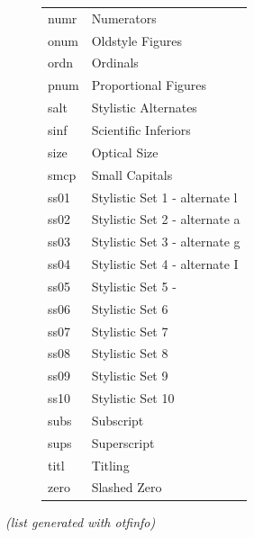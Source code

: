 \documentclass[10pt,a4paper,english]{article}
\begin{document}
\begin{figure}[ht]
\begin{tabular}{>{\ttfamily}l l}
        numr & Numerators \\
        onum & Oldstyle Figures \\
        ordn & Ordinals \\
        pnum & Proportional Figures \\
        salt & Stylistic Alternates \\
        sinf & Scientific Inferiors \\
        size & Optical Size \\
        smcp & Small Capitals \\
        ss01 & Stylistic Set 1 - alternate l \\
        ss02 & Stylistic Set 2 - alternate a \\
        ss03 & Stylistic Set 3 - alternate g \\
        ss04 & Stylistic Set 4 - alternate I \\
        ss05 & Stylistic Set 5 - \\
        ss06 & Stylistic Set 6 \\
        ss07 & Stylistic Set 7 \\
        ss08 & Stylistic Set 8 \\
        ss09 & Stylistic Set 9 \\
        ss10 & Stylistic Set 10 \\
        subs & Subscript \\
        sups & Superscript \\
        titl & Titling \\
        zero & Slashed Zero \\
	\end{tabular}
\end{figure}
\textit{(list generated with otfinfo)}
\end{document}
